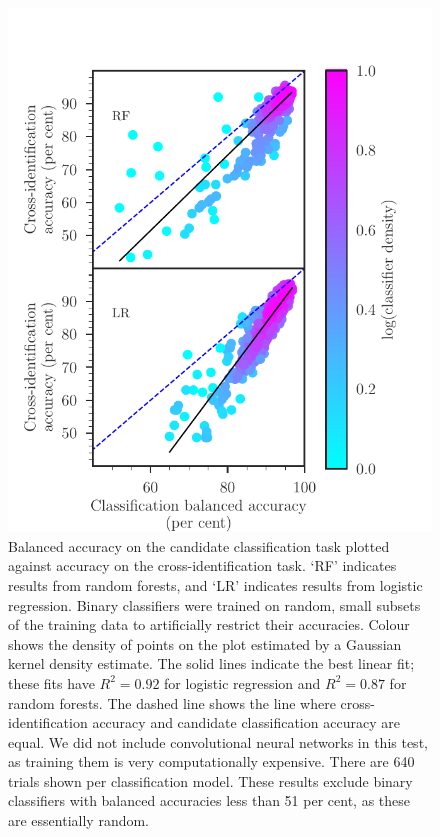     \begin{figure}
      \centering
      \includegraphics[width=0.6\columnwidth]{atlas-images/gct-to-xid.pdf}
      \caption[Balanced accuracy on the candidate classification task plotted
      against accuracy on the cross-identification task.]{Balanced accuracy on the candidate classification task plotted
      against accuracy on the cross-identification task. `RF' indicates
      results from random forests, and `LR' indicates results from logistic
      regression. Binary classifiers were trained on random, small subsets of the
      training data to artificially restrict their accuracies. Colour shows
      the density of points on the plot estimated by a Gaussian kernel density
      estimate. The solid lines indicate the best linear fit; these fits have
      $R^2 = 0.92$ for logistic regression and $R^2 = 0.87$ for random
      forests.
      {The dashed line shows the line where cross-identification accuracy and candidate classification accuracy are equal.}
      We did not include convolutional neural networks in this test,
      as training them is very computationally expensive. There are 640 trials shown per classification model. These results
      exclude binary classifiers with balanced accuracies less than 51 per cent, as
      these are essentially random.
      \label{fig:gct-to-xid}}
    \end{figure}

